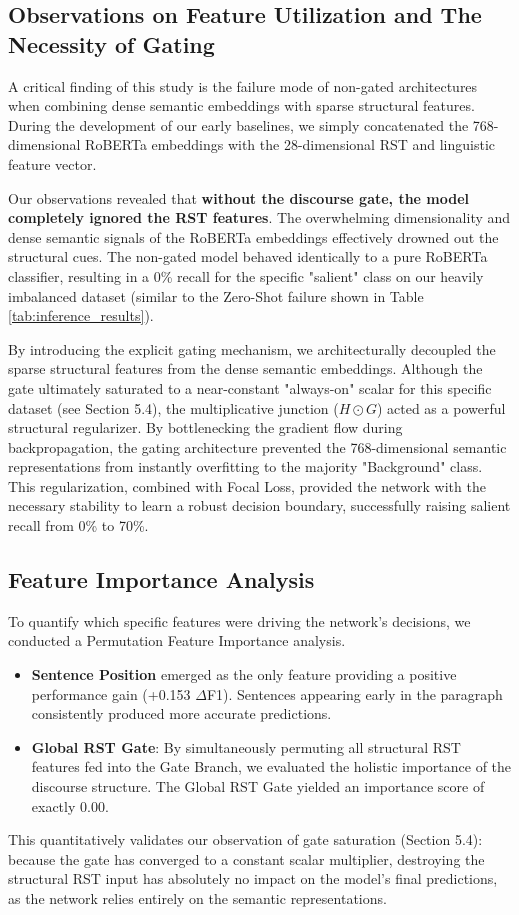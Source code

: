 \documentclass[11pt,a4paper]{article}
\begin{document}
\subsection{Observations on Feature Utilization and The Necessity of Gating}
A critical finding of this study is the failure mode of non-gated architectures when combining dense semantic embeddings with sparse structural features. During the development of our early baselines, we simply concatenated the 768-dimensional RoBERTa embeddings with the 28-dimensional RST and linguistic feature vector. 

Our observations revealed that \textbf{without the discourse gate, the model completely ignored the RST features}. The overwhelming dimensionality and dense semantic signals of the RoBERTa embeddings effectively drowned out the structural cues. The non-gated model behaved identically to a pure RoBERTa classifier, resulting in a 0\% recall for the specific "salient" class on our heavily imbalanced dataset (similar to the Zero-Shot failure shown in Table \ref{tab:inference_results}).

By introducing the explicit gating mechanism, we architecturally decoupled the sparse structural features from the dense semantic embeddings. Although the gate ultimately saturated to a near-constant "always-on" scalar for this specific dataset (see Section 5.4), the multiplicative junction ($H \odot G$) acted as a powerful structural regularizer. By bottlenecking the gradient flow during backpropagation, the gating architecture prevented the 768-dimensional semantic representations from instantly overfitting to the majority "Background" class. This regularization, combined with Focal Loss, provided the network with the necessary stability to learn a robust decision boundary, successfully raising salient recall from 0\% to 70\%.

\subsection{Feature Importance Analysis}
To quantify which specific features were driving the network's decisions, we conducted a Permutation Feature Importance analysis. 
\begin{itemize}
    \item \textbf{Sentence Position} emerged as the only feature providing a positive performance gain (+0.153 $\Delta$F1). Sentences appearing early in the paragraph consistently produced more accurate predictions.
    \item \textbf{Global RST Gate}: By simultaneously permuting all structural RST features fed into the Gate Branch, we evaluated the holistic importance of the discourse structure. The Global RST Gate yielded an importance score of exactly 0.00.
\end{itemize}
This quantitatively validates our observation of gate saturation (Section 5.4): because the gate has converged to a constant scalar multiplier, destroying the structural RST input has absolutely no impact on the model's final predictions, as the network relies entirely on the semantic representations.
\end{document}
